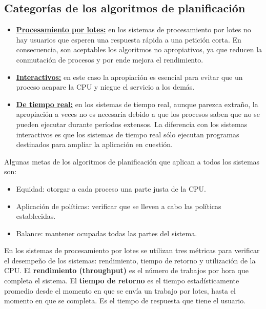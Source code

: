 \subsection{Categorías de los algoritmos de planificación}

\begin{itemize}

\item \textbf{\underline{Procesamiento por lotes:}} en los sistemas de procesamiento por lotes no hay usuarios que esperen una respuesta rápida a una petición corta. En consecuencia, son aceptables los algoritmos no apropiativos, ya que reducen la conmutación de procesos y por ende mejora el rendimiento.

\item \textbf{\underline{Interactivos:}} en este caso la apropiación es esencial para evitar que un proceso acapare la CPU y niegue el servicio a los demás.

\item \textbf{\underline{De tiempo real:}} en los sistemas de tiempo real, aunque parezca extraño, la apropiación a veces no es necesaria debido a que los procesos saben que no se pueden ejecutar durante períodos extensos. La diferencia con los sistemas interactivos es que los sistemas de tiempo real sólo ejecutan programas destinados para ampliar la aplicación en cuestión.

\end{itemize}

Algunas metas de los algoritmos de planificación que aplican a todos los sistemas son:

\begin{itemize}
\item Equidad: otorgar a cada proceso una parte justa de la CPU.
\item Aplicación de políticas: verificar que se lleven a cabo las políticas establecidas.
\item Balance: mantener ocupadas todas las partes del sistema.
\end{itemize}

En los sistemas de procesamiento por lotes se utilizan tres métricas para verificar el desempeño de los sistemas: rendimiento, tiempo de retorno y utilización de la CPU. El \textbf{rendimiento (throughput)} es el número de trabajos por hora que completa el sistema. El \textbf{tiempo de retorno} es el tiempo estadísticamente promedio desde el momento en que se envía un trabajo por lotes, hasta el momento en que se completa. Es el tiempo de respuesta que tiene el usuario.

